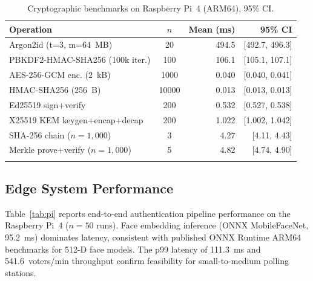 \documentclass[pdflatex,sn-mathphys-num]{sn-jnl}%
\theoremstyle{thmstyleone}%
\theoremstyle{thmstyletwo}%
\theoremstyle{thmstylethree}%
\begin{document}
\begin{table}[t]
\caption{Cryptographic benchmarks on Raspberry Pi~4 (ARM64), 95\% CI.}
\label{tab:crypto}%
\begin{tabular}{@{}lcrr@{}}
  \toprule
  Operation & $n$ & Mean (ms) & 95\% CI \\
  \midrule
  Argon2id (t=3, m=64~MB)         & 20     & 494.5  & [492.7, 496.3] \\
  PBKDF2-HMAC-SHA256 (100k iter.) & 100    & 106.1  & [105.1, 107.1] \\
  AES-256-GCM enc. (2~kB)         & 1000   & 0.040  & [0.040, 0.041] \\
  HMAC-SHA256 (256~B)             & 10000  & 0.013  & [0.013, 0.013] \\
  Ed25519 sign+verify             & 200    & 0.532  & [0.527, 0.538] \\
  X25519 KEM keygen+encap+decap   & 200    & 1.022  & [1.002, 1.042] \\
  SHA-256 chain ($n=1{,}000$)     & 3      & 4.27   & [4.11, 4.43]   \\
  Merkle prove+verify ($n=1{,}000$) & 5    & 4.82   & [4.74, 4.90]   \\
  \botrule
\end{tabular}
\end{table}

\subsection{Edge System Performance}

Table~\ref{tab:pi} reports end-to-end authentication pipeline performance on the
Raspberry Pi~4 ($n=50$ runs). Face embedding inference (ONNX MobileFaceNet,
95.2~ms) dominates latency, consistent with published ONNX Runtime ARM64
benchmarks for 512-D face models. The p99 latency of 111.3~ms and
541.6~voters/min throughput confirm feasibility for small-to-medium polling
stations.
\end{document}
